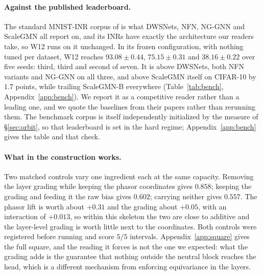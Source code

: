 \paragraph{Against the published leaderboard.} The standard MNIST-INR corpus of
\citet{navon2023dws} is what DWSNets, NFN, NG-GNN and ScaleGMN all report on, and its INRs have
exactly the architecture our readers take, so W12 runs on it unchanged. In its frozen
configuration, with nothing tuned per dataset, W12 reaches $93.08 \pm 0.44$, $75.15 \pm 0.31$ and
$38.16 \pm 0.22$ over five seeds: third, third and second of seven. It is above DWSNets, both NFN
variants and NG-GNN on all three, and above ScaleGMN itself on CIFAR-10 by $1.7$ points, while
trailing ScaleGMN-B everywhere (Table~\ref{tab:bench}, Appendix~\ref{app:bench}). We report it
as a competitive reader rather than a leading one, and we quote the baselines from their papers
rather than rerunning them. The benchmark corpus is itself independently initialized by the measure of
\S\ref{sec:orbit}, so that leaderboard is set in the hard regime; Appendix~\ref{app:bench} gives the
table and that check.

\paragraph{What in the construction works.} Two matched controls vary one ingredient each at the
same capacity. Removing the layer grading while keeping the phasor coordinates gives $0.858$;
keeping the grading and feeding it the raw bias gives $0.602$; carrying neither gives $0.557$. The
phasor lift is worth about $+0.31$ and the grading about $+0.05$, with an interaction of $+0.013$,
so within this skeleton the two are close to additive and the layer-level grading is worth little
next to the coordinates. Both controls were registered before running and score $5/5$ intervals.
Appendix~\ref{app:square} gives the full square, and the reading it forces is not the one we
expected: what the grading adds is the guarantee that nothing outside the neutral block reaches the
head, which is a different mechanism from enforcing equivariance in the layers.
